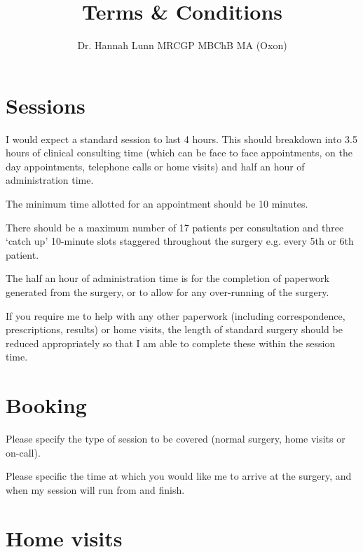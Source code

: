 \documentclass[12pt, a4paper]{article}
\title{Terms \& Conditions\vspace{-2ex}}}
\author{Dr. Hannah Lunn MRCGP MBChB MA (Oxon)\vspace{-2ex}}
\begin{document}
\maketitle

\section{Sessions}
\label{sessions}

I would expect a standard session to last 4 hours.
This should breakdown into 3.5 hours of clinical consulting time (which can be face to face appointments, on the day appointments, telephone calls or home visits) and half an hour of administration time.

The minimum time allotted for an appointment should be 10 minutes.

There should be a maximum number of 17 patients per consultation and three ‘catch up’ 10-minute slots staggered throughout the surgery e.g. every 5th or 6th patient.

The half an hour of administration time is for the completion of paperwork generated from the surgery, or to allow for any over-running of the surgery.

If you require me to help with any other paperwork (including correspondence, prescriptions, results) or home visits, the length of standard surgery should be reduced appropriately so that I am able to complete these within the session time.

\section{Booking}

Please specify the type of session to be covered (normal surgery, home visits or on-call).

Please specific the time at which you would like me to arrive at the surgery, and when my session will run from and finish.

\section{Home visits}
\end{document}
